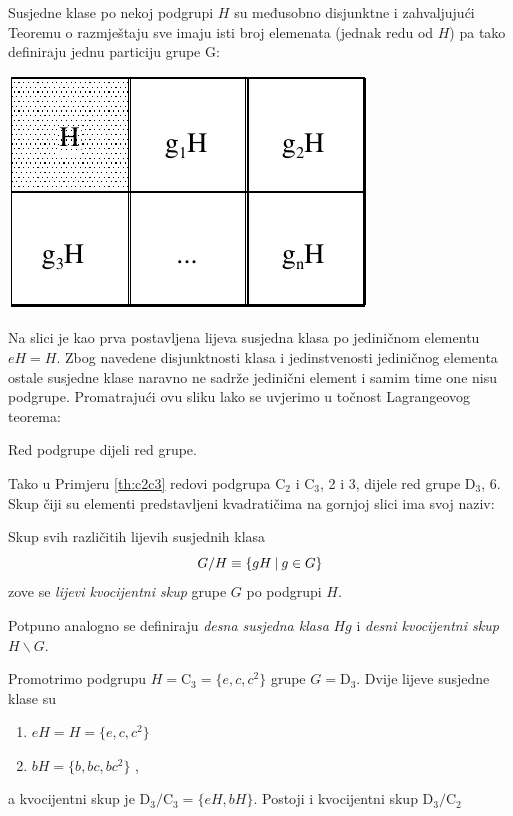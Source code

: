 Susjedne klase po nekoj podgrupi $H$ su međusobno disjunktne i
zahvaljujući Teoremu o razmještaju sve imaju isti broj elemenata (jednak redu od $H$)
pa tako definiraju jednu particiju grupe G:\\[2ex]
\centerline{\includegraphics[scale=1.0]{pics/lagrange}}

Na slici je kao prva postavljena lijeva susjedna klasa po jediničnom
elementu $eH = H$. Zbog navedene disjunktnosti klasa i jedinstvenosti
jediničnog elementa ostale susjedne klase naravno ne sadrže jedinični element i
samim time one nisu podgrupe. 
Promatrajući ovu sliku lako se uvjerimo u točnost Lagrangeovog
teorema:

\begin{teorem}[Lagrange]
Red podgrupe dijeli red grupe.
\end{teorem}

Tako u Primjeru \ref{th:c2c3} redovi podgrupa C$_2$ i C$_3$, 2 i 3, dijele red
grupe D$_3$, 6. Skup čiji su elementi predstavljeni kvadratičima na gornjoj slici
ima svoj naziv:

\begin{definicija}
Skup svih različitih lijevih susjednih klasa 
\begin{displaymath}
      G/H \equiv \{gH \: | \: g\in G\}
\end{displaymath}
zove se \emph{lijevi kvocijentni skup} grupe $G$ po podgrupi $H$.
\end{definicija}

Potpuno analogno se definiraju \emph{desna susjedna klasa} $Hg$
i \emph{desni kvocijentni skup} $H\backslash G$.

\begin{primjer}[D$_3$]
    Promotrimo podgrupu $H=\mathrm{C}_3=\{e, c, c^2\}$ grupe $G=\mathrm{D}_3$.
Dvije lijeve susjedne klase su
\begin{enumerate}
\item $eH=H=\{e, c, c^2\}$ \; 
\item $bH=\{b, bc, bc^2\}$ \;,
\end{enumerate}
a kvocijentni skup je $\mathrm{D}_3/\mathrm{C}_3=\{eH, bH\}$. Postoji i kvocijentni 
skup $\mathrm{D}_3/\mathrm{C}_2$
\end{primjer}

